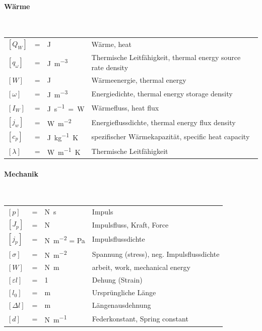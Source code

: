 \documentclass[a4paper, 10pt]{scrartcl}
\begin{document}
\begin{multicols}{2}
		\paragraph{Wärme}~\\
		\begin{tabularx}{\linewidth}{lclX}
			$[Q_W]$ &=& \si{\joule} & Wärme, heat\\
			$[q_\omega]$ &=& \si{\joule\per\meter\tothe{3}} & Thermische Leitfähigkeit, thermal energy source rate density \\	
			$[W]$ &=& \si{J} & Wärmeenergie, thermal energy\\
			$[\omega]$ &=& \si{\joule\per\meter\tothe{3}} & Energiedichte, thermal energy storage density \\
			$[I_W]$ &=& \si{\joule\per\second=\watt} & Wärmefluss, heat flux\\
			$[j_w]$ &=& \si{\watt\per\square\meter} & Energieflussdichte, thermal energy flux density \\
			$[c_p]$ &=& \si{\joule\per\kilogram\kelvin} & spezifischer Wärmekapazität, specific heat capacity\\
			$[\lambda]$ &=& \si{\watt\per\meter\kelvin} & Thermische Leitfähigkeit \\	
		\end{tabularx}
		
		\paragraph{Mechanik}~\\
		\begin{tabularx}{\linewidth}{lclX}
			$[p]$ &=& \si{\newton\second} & Impuls \\
			$[J_p]$ &=& \si{\newton} & Impulsfluss, Kraft, Force \\
			$[j_p]$ &=& \si{\newton\per\square\meter} = \si{\pascal} & Impulsflussdichte\\
			$[\sigma]$ &=& \si{\newton\per\square\meter} & Spannung (stress), neg. Impulsflussdichte \\
			$[W]$ &=& \si{\newton\meter} & arbeit, work, mechanical energy\\
			$[\varepsilon l]$ &=& 1& Dehung (Strain)\\
			$[l_0]$ &=& \si{m} & Ursprüngliche Länge \\
			$[\Delta l]$ &=& \si{m} & Längenausdehnung \\
			$[d]$ &=& \si{\newton\per\meter} & Federkonstant, Spring constant\\
			

\end{tabularx}
\end{multicols}
\end{document}

